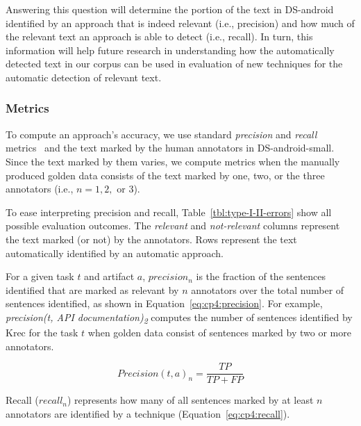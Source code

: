 Answering this question will determine the portion of the text in \acs{DS-android} identified by an approach that 
is indeed relevant (i.e., precision) and how much 
of the relevant text an approach is able to detect (i.e., recall).
In turn, this information will help future research in understanding
how the automatically detected text in our corpus can be used in evaluation of new techniques for the automatic detection of relevant text. 




\subsubsection{Metrics}

To compute an approach's accuracy, we use standard \textit{precision} and \textit{recall} metrics~\cite{Manning2009IR} and the text marked by the human annotators in \acs{DS-android-small}.
Since the text marked by them varies, we compute metrics when the manually produced golden data consists of the text marked by one, two, or the three annotators (i.e., $n=1, 2,$ or $3$).




To ease interpreting precision and recall, Table~\ref{tbl:type-I-II-errors} show all possible evaluation outcomes. The \textit{relevant} and \textit{not-relevant} columns represent the text 
marked (or not) by the annotators. Rows represent the text automatically identified by an automatic approach.






For a given task $t$ and artifact $a$, $precision_n$ is the fraction of the sentences identified that are marked as relevant by $n$ annotators over the total number of sentences identified, as shown in Equation~\ref{eq:cp4:precision}. For example, \textit{precision(t, API documentation)\textsubscript{2}} computes the number of sentences identified by \acs{Krec} for the task $t$ when 
golden data consist of sentences marked by two or more annotators.


\begin{equation}
\label{eq:cp4:precision}    
    Precision(t, a)_n = \frac{TP}{TP + FP}
\end{equation}


Recall ($recall_n$) represents how many of all sentences marked by at least $n$ annotators are identified by a technique (Equation~\ref{eq:cp4:recall}).


